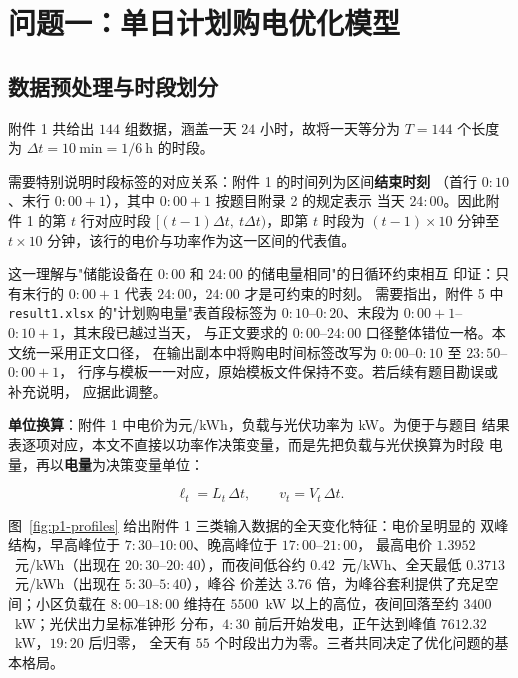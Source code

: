 \documentclass[withoutpreface,bwprint]{cumcmthesis}
\begin{document}
\section{问题一：单日计划购电优化模型}

\subsection{数据预处理与时段划分}

附件 1 共给出 $144$ 组数据，涵盖一天 $24$ 小时，故将一天等分为
$T = 144$ 个长度为 $\Delta t = 10\ \text{min} = 1/6\ \text{h}$ 的时段。

需要特别说明时段标签的对应关系：附件 1 的时间列为区间\textbf{结束时刻}
（首行 $0{:}10$、末行 $0{:}00{+}1$），其中 $0{:}00{+}1$ 按题目附录 2 的规定表示
当天 $24{:}00$。因此附件 1 的第 $t$ 行对应时段
$[(t-1)\Delta t,\ t\Delta t)$，即第 $t$ 时段为 $(t-1)\times 10$ 分钟至
$t \times 10$ 分钟，该行的电价与功率作为这一区间的代表值。

这一理解与"储能设备在 $0{:}00$ 和 $24{:}00$ 的储电量相同"的日循环约束相互
印证：只有末行的 $0{:}00{+}1$ 代表 $24{:}00$，$24{:}00$ 才是可约束的时刻。
需要指出，附件 5 中 \texttt{result1.xlsx} 的"计划购电量"表首段标签为
$0{:}10$--$0{:}20$、末段为 $0{:}00{+}1$--$0{:}10{+}1$，其末段已越过当天，
与正文要求的 $0{:}00$--$24{:}00$ 口径整体错位一格。本文统一采用正文口径，
在输出副本中将购电时间标签改写为 $0{:}00$--$0{:}10$ 至 $23{:}50$--$0{:}00{+}1$，
行序与模板一一对应，原始模板文件保持不变。若后续有题目勘误或补充说明，
应据此调整。

\textbf{单位换算}：附件 1 中电价为元/kWh，负载与光伏功率为 kW。为便于与题目
结果表逐项对应，本文不直接以功率作决策变量，而是先把负载与光伏换算为时段
电量，再以\textbf{电量}为决策变量单位：

\begin{equation}
  \ell_t = L_t\,\Delta t, \qquad v_t = V_t\,\Delta t .
  \label{eq:unit}
\end{equation}

图~\ref{fig:p1-profiles} 给出附件 1 三类输入数据的全天变化特征：电价呈明显的
双峰结构，早高峰位于 $7{:}30$--$10{:}00$、晚高峰位于 $17{:}00$--$21{:}00$，
最高电价 $1.3952$~元/kWh（出现在 $20{:}30$--$20{:}40$），而夜间低谷约
$0.42$~元/kWh、全天最低 $0.3713$~元/kWh（出现在 $5{:}30$--$5{:}40$），峰谷
价差达 $3.76$ 倍，为峰谷套利提供了充足空间；小区负载在 $8{:}00$--$18{:}00$
维持在 $5500$~kW 以上的高位，夜间回落至约 $3400$~kW；光伏出力呈标准钟形
分布，$4{:}30$ 前后开始发电，正午达到峰值 $7612.32$~kW，$19{:}20$ 后归零，
全天有 $55$ 个时段出力为零。三者共同决定了优化问题的基本格局。
\end{document}
